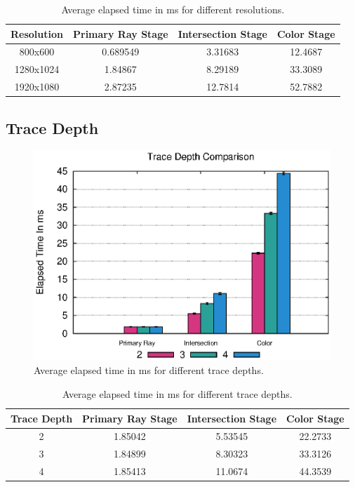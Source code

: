 \documentclass{article}
\begin{document}
\begin{table}[h!btp]
\centering
\def\arraystretch{1.5}
\begin{tabular}{c|c|c|c}
Resolution  & Primary Ray Stage & Intersection Stage & Color Stage \\ [2pt]
\hline
800x600 & 0.689549 & 3.31683 & 12.4687 \\
\hline
1280x1024 & 1.84867 & 8.29189 & 33.3089 \\
\hline
1920x1080 & 2.87235 & 12.7814 & 52.7882 \\
\hline
\end{tabular}
\caption{Average elapsed time in ms for different resolutions. \label{tab:ResultsResolution}}
\end{table}


\subsection{Trace Depth}

\begin{figure}[h!tbp]
\centering
\includegraphics[width=1.0\columnwidth]{Figures/traceDepth.eps}
\caption{Average elapsed time in ms for different trace depths. \label{fig:traceDepth}}
\end{figure}


\begin{table}[h!btp]
\centering
\def\arraystretch{1.5}
\begin{tabular}{c|c|c|c}
Trace Depth & Primary Ray Stage & Intersection Stage & Color Stage \\ [2pt]
\hline
2 & 1.85042 & 5.53545 & 22.2733 \\
\hline
3 & 1.84899 & 8.30323 & 33.3126 \\
\hline
4 & 1.85413 & 11.0674 & 44.3539 \\
\hline
\end{tabular}
\caption{Average elapsed time in ms for different trace depths. \label{tab:ResultsTraceDepth}}
\end{table}
\end{document}
